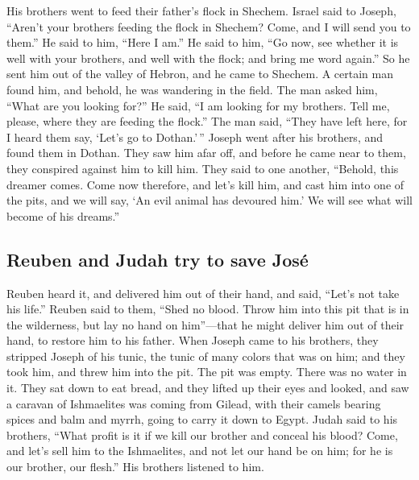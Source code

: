  His brothers went to feed their father's flock in
Shechem.  Israel said to Joseph, ``Aren't your brothers
feeding the flock in Shechem? Come, and I will send you to them.'' He
said to him, ``Here I am.''  He said to him, ``Go now,
see whether it is well with your brothers, and well with the flock; and
bring me word again.'' So he sent him out of the valley of Hebron, and
he came to Shechem.  A certain man found him, and behold,
he was wandering in the field. The man asked him, ``What are you looking
for?''  He said, ``I am looking for my brothers. Tell me,
please, where they are feeding the flock.''  The man
said, ``They have left here, for I heard them say, `Let's go to
Dothan.'\,'' Joseph went after his brothers, and found them in Dothan.
 They saw him afar off, and before he came near to them,
they conspired against him to kill him.  They said to one
another, ``Behold, this dreamer comes.  Come now
therefore, and let's kill him, and cast him into one of the pits, and we
will say, `An evil animal has devoured him.' We will see what will
become of his dreams.''

\hypertarget{reuben-and-judah-try-to-save-josuxe9}{%
\subsection{Reuben and Judah try to save
José}\label{reuben-and-judah-try-to-save-josuxe9}}

 Reuben heard it, and delivered him out of their hand,
and said, ``Let's not take his life.''  Reuben said to
them, ``Shed no blood. Throw him into this pit that is in the
wilderness, but lay no hand on him''---that he might deliver him out of
their hand, to restore him to his father.  When Joseph
came to his brothers, they stripped Joseph of his tunic, the tunic of
many colors that was on him;  and they took him, and
threw him into the pit. The pit was empty. There was no water in it.
 They sat down to eat bread, and they lifted up their
eyes and looked, and saw a caravan of Ishmaelites was coming from
Gilead, with their camels bearing spices and balm and myrrh, going to
carry it down to Egypt.  Judah said to his brothers,
``What profit is it if we kill our brother and conceal his blood?
 Come, and let's sell him to the Ishmaelites, and not let
our hand be on him; for he is our brother, our flesh.'' His brothers
listened to him.

